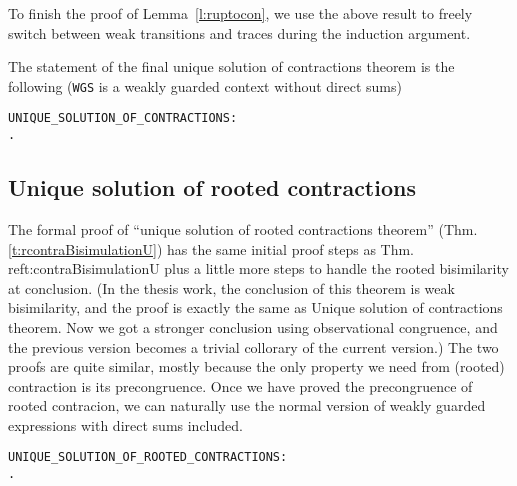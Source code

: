To finish the proof of Lemma~\ref{l:ruptocon}, we use the  above
result to freely switch between weak transitions and traces
during the induction argument.

The statement of the final unique solution of contractions theorem is
the following (\texttt{WGS} is a weakly guarded context without direct
sums)
\begin{alltt}
UNIQUE_SOLUTION_OF_CONTRACTIONS:
\HOLTokenTurnstile{}   \HOLSymConst{\HOLTokenImp{}} \HOLSymConst{\HOLTokenForall{}} .  \HOLSymConst{\HOLTokenContracts{}}   \HOLSymConst{\HOLTokenConj{}}  \HOLSymConst{\HOLTokenContracts{}}   \HOLSymConst{\HOLTokenImp{}}  \HOLSymConst{\HOLTokenWeakEQ} 
\end{alltt}

\subsection{Unique solution of rooted contractions}

The formal proof of ``unique solution of rooted contractions theorem''
(Thm.\; \ref{t:rcontraBisimulationU}) has the
same initial proof steps as Thm.\; ref{{t:contraBisimulationU}} plus a
little more steps to handle the rooted bisimilarity at conclusion. (In the thesis work, the conclusion of this theorem
is weak bisimilarity, and the proof is exactly the same as Unique
solution of contractions theorem. Now we got a stronger conclusion
using observational congruence, and the previous version becomes a
trivial collorary of the current version.) The
two proofs are quite similar, mostly because the only property we need
from (rooted) contraction is its precongruence. Once we have proved
the precongruence of rooted contracion, we can naturally use the
normal version of weakly guarded expressions with direct sums included.

\begin{alltt}
UNIQUE_SOLUTION_OF_ROOTED_CONTRACTIONS:
\HOLTokenTurnstile{}   \HOLSymConst{\HOLTokenImp{}} \HOLSymConst{\HOLTokenForall{}} .  \HOLSymConst{\HOLTokenObsContracts}   \HOLSymConst{\HOLTokenConj{}}  \HOLSymConst{\HOLTokenObsContracts}   \HOLSymConst{\HOLTokenImp{}}  \HOLSymConst{\HOLTokenObsCongr} 
\end{alltt}
